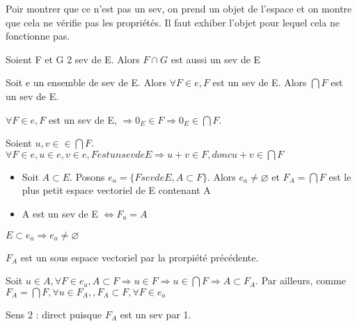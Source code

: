 \documentclass[french]{yLectureNote}
\begin{document}
Poir montrer que ce n'est pas un sev, on prend un objet de l'espace et on montre que cela ne vérifie pas les propriétés. Il faut exhiber l'objet pour lequel cela ne fonctionne pas.
\begin{proposition}
Soient F et G 2 sev de E. Alors \( F \cap G\) est aussi un sev de E

Soit e un ensemble de sev de E. Alors \(\forall F\in e, F\) est un sev de E. Alors \(\bigcap F\) est un sev de E.
\end{proposition}
\begin{myproof}
\(\forall F\in e, F\) est un sev de E, \(\Rightarrow 0_E \in F\Rightarrow 0_E \in\bigcap F\).

Soient \(u,v \in \in \bigcap F\). \(\forall F\in e, u\in e, v\in e, F est un sev de E \Rightarrow u+v \in F, donc u+v\in \bigcap F\)
\end{myproof}
\begin{proposition}[Corollaire]
\begin{itemize}
 \item Soit \(A\subset E\). Posons \(e_a = \{F sev de E,A\subset F\}\). Alors \(e_a \neq \varnothing\) et \(F_A = \bigcap F\) est le plus petit espace vectoriel de E contenant A
 \item A est un sev de E \(\iff F_a = A\)
\end{itemize}
\end{proposition}
\(E\subset e_a \Rightarrow e_a \neq \varnothing\)

\(F_A\) est un sous espace vectoriel par la prorpiété précédente.

Soit \(u\in A, \forall F\in e_a, A\subset F\Rightarrow u\in F\Rightarrow u\in \bigcap F \Rightarrow A\subset F_A\). Par ailleurs, comme \(F_A = \bigcap F,\forall u\in F_A, ,F_A\subset F,\forall F\in e_a\)

Sens 2 : direct puisque \(F_A\) est un sev par 1.
\end{document}
